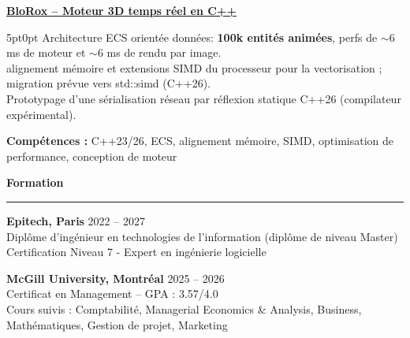 \documentclass[9pt]{extarticle}
\begin{document}
\par\vspace{8pt}

\underline{\bfseries \href{https://github.com/paulogarithm/blorox}{BloRox} -- Moteur 3D temps réel en C++}
\par
\begin{adjustwidth}{5pt}{0pt}
	Architecture ECS orientée données: {\bfseries 100k entités animées}, perfs de $\sim$6 ms de moteur et $\sim$6 ms de rendu par image. \\
	alignement mémoire et extensions SIMD du processeur pour la vectorisation ; migration prévue vers {\ttfamily std::simd} (C++26). \\
	Prototypage d'une sérialisation réseau par réflexion statique C++26 (compilateur expérimental).
\end{adjustwidth}
\par
{\bfseries Compétences :} C++23/26, ECS, alignement mémoire, SIMD, optimisation de performance, conception de moteur
\par\vspace{8pt}

{\large\bfseries Formation}
\par\vspace{-8pt}
\rule{\linewidth}{0.4pt}
\par\vspace{5pt}

{\bfseries Epitech, Paris} \hfill 2022 -- 2027 \\
Diplôme d'ingénieur en technologies de l'information (diplôme de niveau Master) \\
Certification Niveau 7 - Expert en ingénierie logicielle

\vspace{6pt}

{\bfseries McGill University, Montréal} \hfill 2025 -- 2026 \\
Certificat en Management -- GPA : 3.57/4.0 \\
Cours suivis : Comptabilité, Managerial Economics \& Analysis, Business, Mathématiques, Gestion de projet, Marketing
\end{document}
